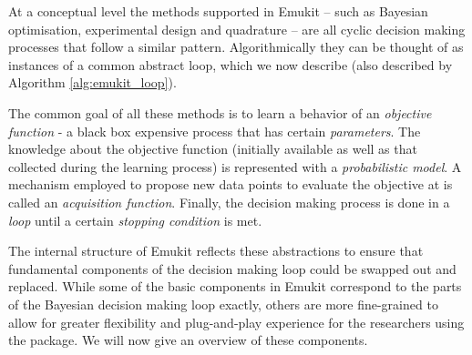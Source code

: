 At a conceptual level the methods supported in Emukit -- such as Bayesian optimisation, experimental design and quadrature -- are all cyclic decision making processes that follow a similar pattern. 
Algorithmically they can be thought of as instances of a common abstract loop, which we now describe (also described by Algorithm \ref{alg:emukit_loop}).

The common goal of all these methods is to learn a behavior of an \textit{objective function} - a black box expensive process that has certain \textit{parameters}. The knowledge about the objective function (initially available as well as that collected during the learning process) is represented with a \textit{probabilistic model}. A mechanism employed to propose new data points to evaluate the objective at is called an \textit{acquisition function}. Finally, the decision making process is done in a \textit{loop} until a certain \textit{stopping condition} is met. 


The internal structure of Emukit reflects these abstractions to ensure that fundamental components of the decision making loop could be swapped out and replaced. While some of the basic components in Emukit correspond to the parts of the Bayesian decision making loop exactly, others are more fine-grained to allow for greater flexibility and plug-and-play experience for the researchers using the package. We will now give an overview of these components.

